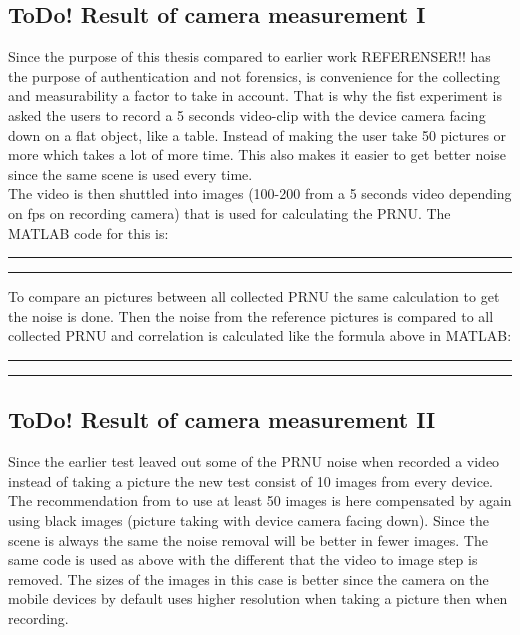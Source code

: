 \subsection{\textbf{ToDo! }Result of camera measurement I}
Since the purpose of this thesis compared to earlier work REFERENSER!! has the purpose of authentication and not forensics, is convenience for the collecting and measurability a factor to take in account. That is why the fist experiment is asked the users to record a 5 seconds video-clip with the device camera facing down on a flat object, like a table. Instead of making the user take 50 pictures or more which takes a lot of more time. This also makes it easier to get better noise since the same scene is used every time. \\
The video is then shuttled into images (100-200 from a 5 seconds video depending on fps on recording camera) that is used for calculating the PRNU. The MATLAB code for this is:\\
\rule{\textwidth}{0.5pt}
  
\rule{\textwidth}{0.5pt}

To compare an pictures between all collected PRNU the same calculation to get the noise is done. Then the noise from the reference pictures is compared to all collected PRNU and correlation is calculated like the formula above in MATLAB:\\
\rule{\textwidth}{0.5pt}
  
\rule{\textwidth}{0.5pt}

\subsection{\textbf{ToDo! }Result of camera measurement II}
Since the earlier test leaved out some of the PRNU noise when recorded a video instead of taking a picture the new test consist of 10 images from every device. The recommendation from \cite{sensor:camera:DCIdent} to use at least 50 images is here compensated by again using black images (picture taking with device camera facing down). Since the scene is always the same the noise removal will be better in fewer images. The same code is used as above with the different that the video to image step is removed. The sizes of the images in this case is better since the camera on the mobile devices by default uses higher resolution when taking a picture then when recording. 

